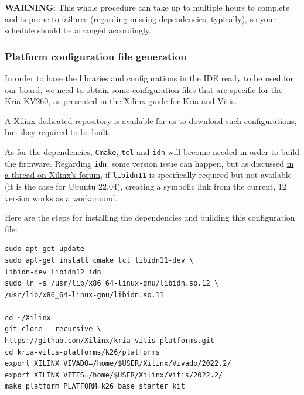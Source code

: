 \documentclass[10pt]{article}
\begin{document}
\begin{tcolorbox}[colback=orange!5!white,colframe=orange!75!black]
\textbf{WARNING}: This whole procedure can take up to multiple hours to complete
and is prone to failures (regarding missing dependencies, typically),
so your schedule should be arranged accordingly.
\end{tcolorbox}

\subsubsection{Platform configuration file generation}
\label{sec:orgd1361b9}
In order to have the libraries and configurations in the IDE ready to be used for our board,
we need to obtain some configuration files that are specific for the Kria KV260,
as presented in the \href{https://xilinx.github.io/kria-apps-docs/kv260/2022.1/build/html/docs/build\_vitis\_platform.html?highlight=xsa}{Xilinx guide for Kria and Vitis}.

A Xilinx \href{https://github.com/Xilinx/kria-vitis-platforms}{dedicated repository} is available for us to download  such configurations,
but they required to be built.

As for the dependencies, \texttt{Cmake}, \texttt{tcl} and \texttt{idn} will become needed in order to build the firmware.
Regarding \texttt{idn}, some version issue can happen, but as discussed \href{https://support.xilinx.com/s/question/0D52E00006jrzsYSAQ/platform-project-cannot-be-created-on-vitis?language=en\\\_US}{in a thread on Xilinx's forum},
if \texttt{libidn11} is specifically required but not available (it is the case for Ubuntu 22.04),
creating a symbolic link from the current, 12 version works as a workaround.

Here are the steps for installing the dependencies and building this configuration file:

\begin{verbatim}
sudo apt-get update
sudo apt-get install cmake tcl libidn11-dev \
libidn-dev libidn12 idn
sudo ln -s /usr/lib/x86_64-linux-gnu/libidn.so.12 \
/usr/lib/x86_64-linux-gnu/libidn.so.11

cd ~/Xilinx
git clone --recursive \
https://github.com/Xilinx/kria-vitis-platforms.git
cd kria-vitis-platforms/k26/platforms
export XILINX_VIVADO=/home/$USER/Xilinx/Vivado/2022.2/
export XILINX_VITIS=/home/$USER/Xilinx/Vitis/2022.2/
make platform PLATFORM=k26_base_starter_kit
\end{verbatim}
\end{document}
